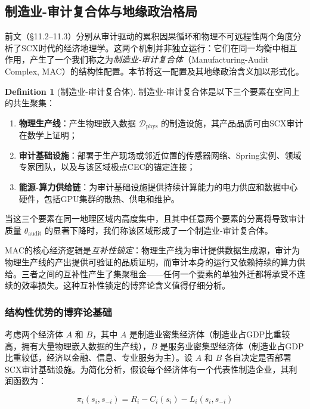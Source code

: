 \documentclass[12pt,a4paper]{ctexart}
\theoremstyle{definition}
\newtheorem{definition}{Definition}[section]
\theoremstyle{remark}
\begin{document}
\subsection{制造业-审计复合体与地缘政治格局}

前文（§11.2–11.3）分别从审计驱动的累积因果循环和物理不可远程性两个角度分析了SCX时代的经济地理学。这两个机制并非独立运行：它们在同一均衡中相互作用，产生了一个我们称之为\textit{制造业-审计复合体}（Manufacturing-Audit Complex, MAC）的结构性配置。本节将这一配置及其地缘政治含义加以形式化。

\begin{definition}[制造业-审计复合体]
制造业-审计复合体是以下三个要素在空间上的共生聚集：
\begin{enumerate}[label=(\roman*)]
    \item \textbf{物理生产线}：产生物理嵌入数据 $\mathcal{D}_{\text{phys}}$ 的制造设施，其产品品质可由SCX审计在数学上证明；
    \item \textbf{审计基础设施}：部署于生产现场或邻近位置的传感器网络、Spring实例、领域专家团队，以及与该区域极点CEC的锚定连接；
    \item \textbf{能源-算力供给链}：为审计基础设施提供持续计算能力的电力供应和数据中心硬件，包括GPU集群的散热、供电和维护。
\end{enumerate}
当这三个要素在同一地理区域内高度集中，且其中任意两个要素的分离将导致审计质量 $\theta_{\text{audit}}$ 的显著下降时，我们称该区域形成了一个制造业-审计复合体。
\end{definition}

MAC的核心经济逻辑是\textit{互补性锁定}：物理生产线为审计提供数据生成源，审计为物理生产线的产出提供可验证的品质证明，而审计本身的运行又依赖持续的算力供给。三者之间的互补性产生了集聚租金——任何一个要素的单独外迁都将承受不连续的效率损失。这种互补性锁定的博弈论含义值得仔细分析。

\subsubsection*{结构性优势的博弈论基础}

考虑两个经济体 $A$ 和 $B$，其中 $A$ 是制造业密集经济体（制造业占GDP比重较高，拥有大量物理嵌入数据的生产线），$B$ 是服务业密集型经济体（制造业占GDP比重较低，经济以金融、信息、专业服务为主）。设 $A$ 和 $B$ 各自决定是否部署SCX审计基础设施。为简化分析，假设每个经济体有一个代表性制造企业，其利润函数为：

\begin{equation}
\pi_i(s_i, s_{-i}) = R_i - C_i(s_i) - L_i(s_i, s_{-i})
\end{equation}
\end{document}
